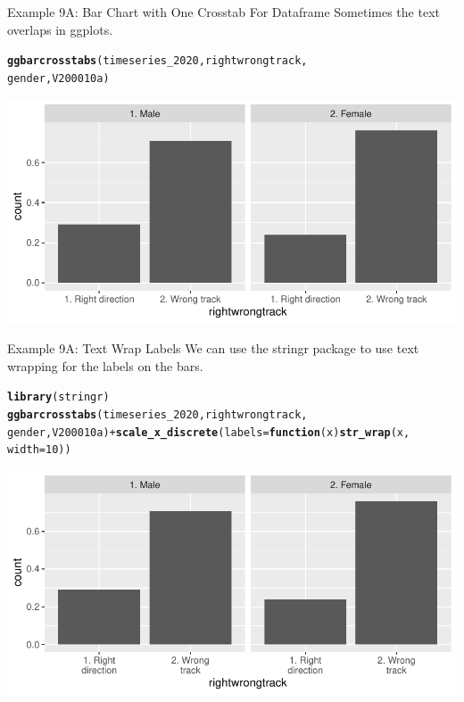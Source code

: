 \documentclass{beamer}\usepackage[]{graphicx}\usepackage[]{color}
\makeatletter
\newcommand{\hlnum}[1]{\textcolor[rgb]{0.686,0.059,0.569}{#1}}%
\newcommand{\hlopt}[1]{\textcolor[rgb]{0,0,0}{#1}}%
\newcommand{\hlstd}[1]{\textcolor[rgb]{0.345,0.345,0.345}{#1}}%
\newcommand{\hlkwa}[1]{\textcolor[rgb]{0.161,0.373,0.58}{\textbf{#1}}}%
\newcommand{\hlkwc}[1]{\textcolor[rgb]{0.333,0.667,0.333}{#1}}%
\newcommand{\hlkwd}[1]{\textcolor[rgb]{0.737,0.353,0.396}{\textbf{#1}}}%
\newenvironment{kframe}{%
 \def\at@end@of@kframe{}%
 \ifinner\ifhmode%
  \def\at@end@of@kframe{\end{minipage}}%
  \begin{minipage}{\columnwidth}%
 \fi\fi%
 \def\FrameCommand##1{\hskip\@totalleftmargin \hskip-\fboxsep
 \colorbox{shadecolor}{##1}\hskip-\fboxsep
     \hskip-\linewidth \hskip-\@totalleftmargin \hskip\columnwidth}%
 \MakeFramed {\advance\hsize-\width
   \@totalleftmargin\z@ \linewidth\hsize
   \@setminipage}}%
 {\par\unskip\endMakeFramed%
 \at@end@of@kframe}
\newenvironment{knitrout}{}{} %
\makeatother
\begin{document}
\begin{frame}[fragile]{Example 9A: Bar Chart with One Crosstab For Dataframe}
Sometimes the text overlaps in ggplots.
\begin{knitrout}
\color{fgcolor}\begin{kframe}
\begin{alltt}
\hlkwd{ggbarcrosstabs}\hlstd{(timeseries_2020, rightwrongtrack,}
    \hlstd{gender, V200010a)}
\end{alltt}
\end{kframe}
\includegraphics[width=0.95\linewidth]{figure/unnamed-chunk-36-1} 
\end{knitrout}
\end{frame}

\begin{frame}[fragile]{Example 9A: Text Wrap Labels}
We can use the stringr package to use text wrapping for the labels on the bars.
\begin{knitrout}
\color{fgcolor}\begin{kframe}
\begin{alltt}
\hlkwd{library}\hlstd{(stringr)}
\hlkwd{ggbarcrosstabs}\hlstd{(timeseries_2020, rightwrongtrack,}
    \hlstd{gender, V200010a)} \hlopt{+} \hlkwd{scale_x_discrete}\hlstd{(}\hlkwc{labels} \hlstd{=} \hlkwa{function}\hlstd{(}\hlkwc{x}\hlstd{)} \hlkwd{str_wrap}\hlstd{(x,}
    \hlkwc{width} \hlstd{=} \hlnum{10}\hlstd{))}
\end{alltt}
\end{kframe}
\includegraphics[width=0.95\linewidth]{figure/unnamed-chunk-37-1} 
\end{knitrout}
\end{frame}
\end{document}
